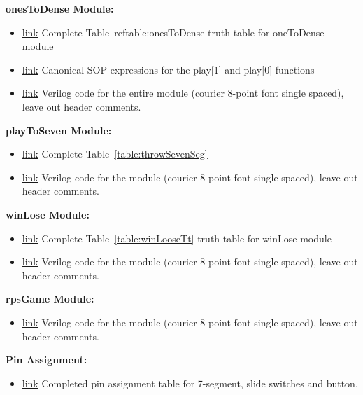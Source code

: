 \textbf{onesToDense Module:}
\begin{itemize}
\item \protect\hyperlink{_Ref30701520}{link} Complete Table~ref{table:onesToDense} truth table for oneToDense module
\item \protect\hyperlink{ones2Dense_CanonicalSOP}{link} Canonical SOP expressions for the play{[}1{]} and play{[}0{]} functions
\item \protect\hyperlink{ones2Dense_Verilog}{link} Verilog code for the entire
module (courier 8-point font single spaced), leave out header comments.
\end{itemize}

\textbf{playToSeven Module:}
\begin{itemize}
\item \protect\hyperlink{_Ref30701476}{link} Complete Table~\ref{table:throwSevenSeg}
\item  \protect\hyperlink{play2Seven_Verilog}{link} Verilog code for the module
(courier 8-point font single spaced), leave out header comments.
\end{itemize}

\textbf{winLose Module:}
\begin{itemize}
\item \protect\hyperlink{_Ref30701411}{link} Complete Table~\ref{table:winLooseTt} truth table for winLose module
\item \protect\hyperlink{winLoose_Verilog}{link} Verilog code for the module
(courier 8-point font single spaced), leave out header comments.
\end{itemize}

\textbf{rpsGame Module:}
\begin{itemize}
\item \protect\hyperlink{play2Seven_Verilog}{link} Verilog code for the module
(courier 8-point font single spaced), leave out header comments.
\end{itemize}

\textbf{Pin Assignment:}
\begin{itemize}
\item \protect\hyperlink{rpsGame_PinAssignment}{link} Completed pin assignment
table for 7-segment, slide switches and button.
\end{itemize}

